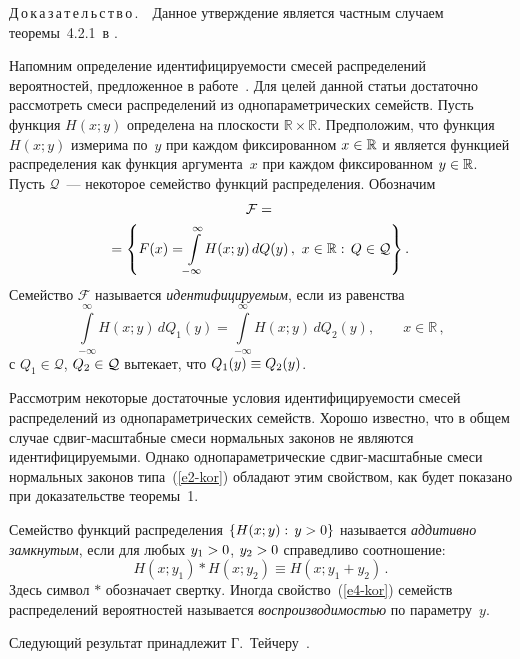 \begin{multicols}{2}
\smallskip

\noindent
Д\,о\,к\,а\,з\,а\,т\,е\,л\,ь\,с\,т\,в\,о\,.\ \  Данное утверждение является частным
случаем теоремы~4.2.1~в \cite{GnedenkoKorolev1996}.

\smallskip

Напомним определение идентифицируемости смесей распределений
вероятностей, предложенное в работе~\cite{Teicher1961}. Для целей
данной статьи достаточно рассмотреть смеси распределений из
однопараметрических семейств. Пусть функция $H(x;y)$ определена на
плоскости $\mathbb{R}\times{\mathbb{R}}$. Предположим, что функция
$H(x;y)$ измерима по~$y$ при каждом фиксированном $x\hm\in\mathbb{R}$ и
является функцией распределения как функция аргумента~$x$ при каждом
фиксированном $y\hm\in\mathbb{R}$. Пусть $\mathcal{Q}$~--- некоторое
семейство функций распределения. Обозначим
\begin{multline}
\mathcal{F}={}\\
\hspace*{-2.5mm}{}=\left\{F(x)=\!\int\limits_{-\infty}^{\infty}\!
H(x;y)\,dQ(y)\,,\ x\in\mathbb{R}:\,Q\in\mathcal{Q}\right\}.\!\!
\label{e3-kor}
\end{multline}
Семейство $\mathcal{F}$ называется {\it идентифицируемым}, если из
равенства
$$
\int\limits_{-\infty}^{\infty}
H(x;y)\,dQ_1(y)=\int\limits_{-\infty}^{\infty}
H(x;y)\,dQ_2(y),\qquad x\in\mathbb{R}\,,
$$
с $Q_1\in\mathcal{Q}$, $Q_2\hm\in\mathcal{Q}$ вытекает, что
$Q_1(y)\hm\equiv Q_2(y)$.

Рассмотрим некоторые достаточные условия идентифицируемости смесей
рас\-пре\-де\-лений из од\-но\-па\-ра\-мет\-ри\-че\-ских семейств. Хорошо
\mbox{известно}, что в общем случае сдвиг-мас\-штаб\-ные смеси нормальных
законов не являются идентифицируемыми. Однако однопараметрические
сдвиг-мас\-штаб\-ные смеси нормальных законов типа~(\ref{e2-kor}) обладают этим
свойством, как будет показано при доказательстве теоремы~1.

Семейство функций распределения $\{H(x;y):\,y\hm>0\}$ называется {\it
аддитивно зам\-к\-ну\-тым}, если для любых $y_1\hm>0$, $y_2\hm>0$
справедливо соотношение:
\begin{equation}
H(x;y_1)\ast H(x;y_2)\equiv H(x;y_1+y_2)\,. \label{e4-kor}
\end{equation}
Здесь символ $\ast$ обозначает свертку. Иногда свойство~(\ref{e4-kor}) семейств
распределений вероятностей называется {\it воспроизводимостью} по
параметру~$y$.

Следующий результат принадлежит Г.~Тейчеру~\cite{Teicher1961}.


\end{multicols}
